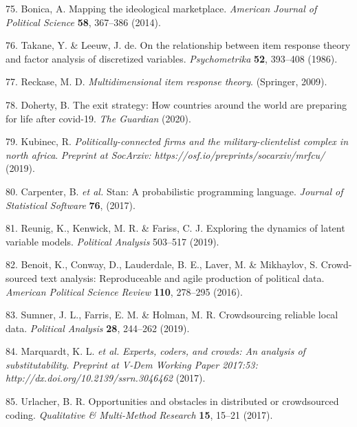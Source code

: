\documentclass[]{article}
\begin{document}
\leavevmode\hypertarget{ref-bonica2014}{}%
75. Bonica, A. Mapping the ideological marketplace. \emph{American Journal of Political Science} \textbf{58}, 367--386 (2014).

\leavevmode\hypertarget{ref-takane1986}{}%
76. Takane, Y. \& Leeuw, J. de. On the relationship between item response theory and factor analysis of discretized variables. \emph{Psychometrika} \textbf{52}, 393--408 (1986).

\leavevmode\hypertarget{ref-reckase2009}{}%
77. Reckase, M. D. \emph{Multidimensional item response theory}. (Springer, 2009).

\leavevmode\hypertarget{ref-doherty2020}{}%
78. Doherty, B. The exit strategy: How countries around the world are preparing for life after covid-19. \emph{The Guardian} (2020).

\leavevmode\hypertarget{ref-kubinec2019}{}%
79. Kubinec, R. \emph{Politically-connected firms and the military-clientelist complex in north africa}. \emph{Preprint at SocArxiv: https://osf.io/preprints/socarxiv/mrfcu/} (2019).

\leavevmode\hypertarget{ref-carpenter2017}{}%
80. Carpenter, B. \emph{et al.} Stan: A probabilistic programming language. \emph{Journal of Statistical Software} \textbf{76}, (2017).

\leavevmode\hypertarget{ref-reunig2019}{}%
81. Reunig, K., Kenwick, M. R. \& Fariss, C. J. Exploring the dynamics of latent variable models. \emph{Political Analysis} 503--517 (2019).

\leavevmode\hypertarget{ref-benoitetal2016}{}%
82. Benoit, K., Conway, D., Lauderdale, B. E., Laver, M. \& Mikhaylov, S. Crowd-sourced text analysis: Reproduceable and agile production of political data. \emph{American Political Science Review} \textbf{110}, 278--295 (2016).

\leavevmode\hypertarget{ref-sumneretal2019}{}%
83. Sumner, J. L., Farris, E. M. \& Holman, M. R. Crowdsourcing reliable local data. \emph{Political Analysis} \textbf{28}, 244--262 (2019).

\leavevmode\hypertarget{ref-marquardtetal2017}{}%
84. Marquardt, K. L. \emph{et al.} \emph{Experts, coders, and crowds: An analysis of substitutability}. \emph{Preprint at V-Dem Working Paper 2017:53: http://dx.doi.org/10.2139/ssrn.3046462} (2017).

\leavevmode\hypertarget{ref-Urlacher2017}{}%
85. Urlacher, B. R. Opportunities and obstacles in distributed or crowdsourced coding. \emph{Qualitative \& Multi-Method Research} \textbf{15}, 15--21 (2017).
\end{document}
